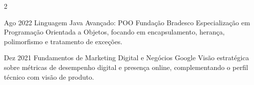 \documentclass[10pt, a4paper]{article}
\begin{document}
\begin{paracol}{2}
\begin{rightcolumn}
\vspace{10pt}

\cvevent
  {Ago 2022}
  {Linguagem Java Avançado: POO}
  {Fundação Bradesco}
  {Especialização em Programação Orientada a Objetos, focando em
  encapsulamento, herança, polimorfismo e tratamento de exceções.}
  {}

\vspace{10pt}

\cvevent
  {Dez 2021}
  {Fundamentos de Marketing Digital e Negócios}
  {Google}
  {Visão estratégica sobre métricas de desempenho digital e presença
  online, complementando o perfil técnico com visão de produto.}
  {}

\end{rightcolumn}

\end{paracol}
\end{document}
